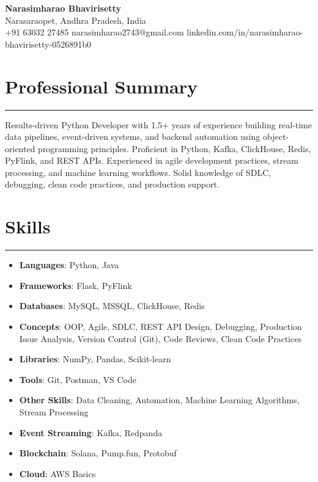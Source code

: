 \documentclass[12pt]{article}
\begin{document}
\begin{center}
  {\huge\textbf{Narasimharao Bhavirisetty}}\\[3pt]
  Narasaraopet, Andhra Pradesh, India \\[1pt]
  +91 63032 27485 \textbullet{} narasimharao2743@gmail.com \textbullet{}
  linkedin.com/in/narasimharao-bhavirisetty-0526891b0
\end{center}

\vspace{6pt}

\section*{Professional Summary}
\vspace{1pt}\hrule\vspace{4pt}
Results-driven Python Developer with 1.5+ years of experience building real-time data pipelines, event-driven systems, and backend automation using object-oriented programming principles. Proficient in Python, Kafka, ClickHouse, Redis, PyFlink, and REST APIs. Experienced in agile development practices, stream processing, and machine learning workflows. Solid knowledge of SDLC, debugging, clean code practices, and production support.

\section*{Skills}
\vspace{1pt}\hrule\vspace{4pt}
\begin{itemize}
  \item \textbf{Languages}: Python, Java
  \item \textbf{Frameworks}: Flask, PyFlink
  \item \textbf{Databases}: MySQL, MSSQL, ClickHouse, Redis
  \item \textbf{Concepts}: OOP, Agile, SDLC, REST API Design, Debugging, Production Issue Analysis, Version Control (Git), Code Reviews, Clean Code Practices
  \item \textbf{Libraries}: NumPy, Pandas, Scikit-learn
  \item \textbf{Tools}: Git, Postman, VS Code
  \item \textbf{Other Skills}: Data Cleaning, Automation, Machine Learning Algorithms, Stream Processing
  \item \textbf{Event Streaming}: Kafka, Redpanda
  \item \textbf{Blockchain}: Solana, Pump.fun, Protobuf
  \item \textbf{Cloud}: AWS Basics
\end{itemize}
\end{document}
